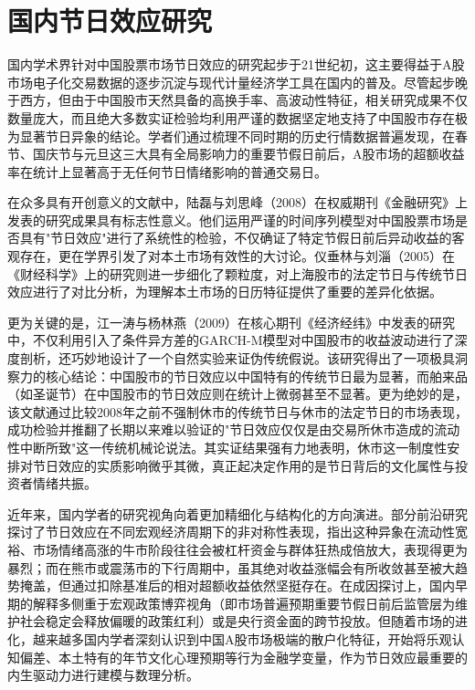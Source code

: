 \documentclass{cupb-thesis}
\begin{document}
\section{国内节日效应研究}


国内学术界针对中国股票市场节日效应的研究起步于21世纪初，这主要得益于A股市场电子化交易数据的逐步沉淀与现代计量经济学工具在国内的普及。尽管起步晚于西方，但由于中国股市天然具备的高换手率、高波动性特征，相关研究成果不仅数量庞大，而且绝大多数实证检验均利用严谨的数据坚定地支持了中国股市存在极为显著节日异象的结论。学者们通过梳理不同时期的历史行情数据普遍发现，在春节、国庆节与元旦这三大具有全局影响力的重要节假日前后，A股市场的超额收益率在统计上显著高于无任何节日情绪影响的普通交易日。


在众多具有开创意义的文献中，陆磊与刘思峰（2008）在权威期刊《金融研究》上发表的研究成果具有标志性意义。他们运用严谨的时间序列模型对中国股票市场是否具有"节日效应"进行了系统性的检验，不仅确证了特定节假日前后异动收益的客观存在，更在学界引发了对本土市场有效性的大讨论。仪垂林与刘淄（2005）在《财经科学》上的研究则进一步细化了颗粒度，对上海股市的法定节日与传统节日效应进行了对比分析，为理解本土市场的日历特征提供了重要的差异化依据。


更为关键的是，江一涛与杨林燕（2009）在核心期刊《经济经纬》中发表的研究中，不仅利用引入了条件异方差的GARCH-M模型对中国股市的收益波动进行了深度剖析，还巧妙地设计了一个自然实验来证伪传统假说。该研究得出了一项极具洞察力的核心结论：中国股市的节日效应以中国特有的传统节日最为显著，而舶来品（如圣诞节）在中国股市的节日效应则在统计上微弱甚至不显著。更为绝妙的是，该文献通过比较2008年之前不强制休市的传统节日与休市的法定节日的市场表现，成功检验并推翻了长期以来难以验证的"节日效应仅仅是由交易所休市造成的流动性中断所致"这一传统机械论说法。其实证结果强有力地表明，休市这一制度性安排对节日效应的实质影响微乎其微，真正起决定作用的是节日背后的文化属性与投资者情绪共振。


近年来，国内学者的研究视角向着更加精细化与结构化的方向演进。部分前沿研究探讨了节日效应在不同宏观经济周期下的非对称性表现，指出这种异象在流动性宽裕、市场情绪高涨的牛市阶段往往会被杠杆资金与群体狂热成倍放大，表现得更为暴烈；而在熊市或震荡市的下行周期中，虽其绝对收益涨幅会有所收敛甚至被大趋势掩盖，但通过扣除基准后的相对超额收益依然坚挺存在。在成因探讨上，国内早期的解释多侧重于宏观政策博弈视角（即市场普遍预期重要节假日前后监管层为维护社会稳定会释放偏暖的政策红利）或是央行资金面的跨节投放。但随着市场的进化，越来越多国内学者深刻认识到中国A股市场极端的散户化特征，开始将乐观认知偏差、本土特有的年节文化心理预期等行为金融学变量，作为节日效应最重要的内生驱动力进行建模与数理分析。
\end{document}
